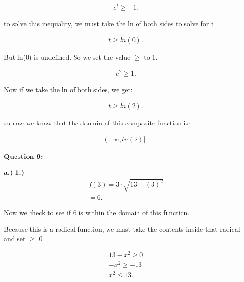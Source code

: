 \documentclass{report}
\begin{document}
    \begin{align*}
        e^t \geq -1 
    .\end{align*}

    \bigbreak \noindent 
    to solve this inequality, we must take the ln of both sides to solve for t 

    \begin{align*}
        t \geq ln(0)
    .\end{align*}

    \bigbreak \noindent 
    But ln(0) is undefined. So we set the value $\geq$ to 1.

    \begin{align*}
        e^2 \geq 1
    .\end{align*}

    \bigbreak \noindent 
    Now if we take the ln of both sides, we get:

    \begin{align*}
        t \geq ln(2)
    .\end{align*}

    \bigbreak \noindent 
    so now we know that the domain of this composite function is:

    \begin{align*}
        (- \infty, ln(2)]
    .\end{align*}


    \bigbreak \noindent \bigbreak \noindent \bigbreak \noindent  
    \begin{Large}
        \textbf{Question 9:}
    \end{Large}

    \bigbreak \noindent 
    \textbf{a.)}
    \bigbreak \noindent 
    \textbf{1.)} 
    \begin{align*}
        f \left(3\right) = 3 \cdot \sqrt{13- \left(3\right)^2} \\ 
        = 6
    .\end{align*}

    \bigbreak \noindent 
    Now we check to see if 6 is within the domain of this function. 

    \bigbreak \noindent 
    Because this is a radical function, we must take the contents inside that radical and set
    $\geq$ 0 

    \begin{align*}
        13-x^2 \geq 0 \\
        -x^2 \geq -13 \\ 
        x^2 \leq 13 
    .\end{align*}
\end{document}
